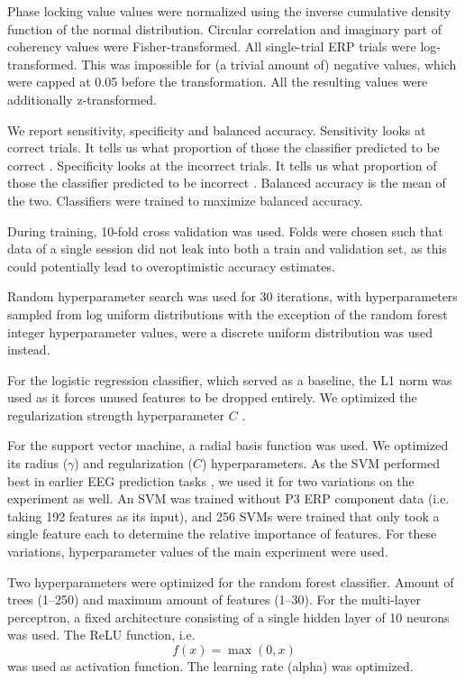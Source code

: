Phase locking value values were normalized using the inverse cumulative
density function of the normal distribution. Circular correlation and
imaginary part of coherency values were Fisher-transformed. All
single-trial ERP trials were log-transformed. This was impossible for (a trivial
amount of) negative values, which were capped at 0.05 before the transformation.
All the resulting values were additionally z-transformed.

We report sensitivity, specificity and balanced accuracy. Sensitivity looks at
correct trials. It tells us what proportion of those the classifier predicted to
be correct \parencite{yerushalmy_statistical_1947}. Specificity looks at the
incorrect trials. It tells us what proportion of those the classifier predicted
to be incorrect \parencite{yerushalmy_statistical_1947}. Balanced accuracy
is the mean of the two. Classifiers were trained to maximize balanced accuracy.

During training, 10-fold cross validation was used. Folds were chosen such that
data of a single session did not leak into both a train and validation set,
as this could potentially lead to overoptimistic accuracy estimates.

Random hyperparameter search was used \parencite{bergstra_random_2012} for 30
iterations, with hyperparameters sampled from log uniform distributions with the
exception of the random forest integer hyperparameter values, were a discrete
uniform distribution was used instead.

For the logistic regression classifier, which served as a baseline, the L1 norm
was used as it forces unused features to be dropped entirely. We optimized the
regularization strength hyperparameter $C$
\parencite[also known as \textit{capacity};][p.~117]{goodfellow_deep_2016}.

For the support vector machine, a radial basis function was used. We optimized
its radius ($\gamma$) and regularization ($C$) hyperparameters. As the SVM
performed best in earlier EEG prediction tasks
\parencite{jin_predicting_2019,lotte_review_2007}, we used it for two variations
on the experiment as well. An SVM was trained without P3 ERP component data
(i.e. taking 192 features as its input), and 256 SVMs were trained that only
took a single feature each to determine the relative importance of features. For
these variations, hyperparameter values of the main experiment were used.

Two hyperparameters were optimized for the random forest classifier. Amount of
trees (1--250) and maximum amount of features (1--30). For the multi-layer
perceptron, a fixed architecture consisting of a single hidden layer of 10
neurons was used. The ReLU function, i.e.
\begin{equation}
f(x) = \max(0, x)
\end{equation}
was used as activation function. The learning rate (alpha) was optimized.

